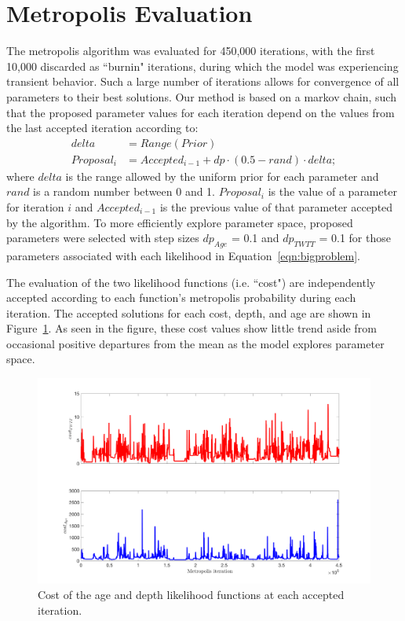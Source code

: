 \section{Metropolis Evaluation}

The metropolis algorithm was evaluated for 450,000 iterations, with the first 10,000 discarded as ``burnin" iterations, during which the model was experiencing transient behavior. Such a large number of iterations allows for convergence of all parameters to their best solutions. Our method is based on a markov chain, such that the proposed parameter values for each iteration depend on the values from the last accepted iteration according to:
\begin{equation}\label{eqn:proposal}
\begin{split}
delta&=Range(Prior) \\
Proposal_i&=Accepted_{i-1} + dp \cdot (0.5-rand) \cdot delta;
\end{split}
\end{equation}
where $delta$ is the range allowed by the uniform prior for each parameter and $rand$ is a random number between 0 and 1. $Proposal_i$ is the value of a parameter for iteration $i$ and $Accepted_{i-1}$ is the previous value of that parameter accepted by the algorithm. To more efficiently explore parameter space, proposed parameters were selected with step sizes $dp_{Age}$ = 0.1 and $dp_{TWTT}$ = 0.1 for those parameters associated with each likelihood in Equation~\ref{eqn:bigproblem}.

The evaluation of the two likelihood functions (i.e. ``cost") are independently accepted according to each function's metropolis probability during each iteration. The accepted solutions for each cost, depth, and age are shown in Figure~\ref{fig:cost}. As seen in the figure, these cost values show little trend aside from occasional positive departures from the mean as the model explores parameter space. 

\begin{figure}[ht]
\centering
\includegraphics[scale=0.4]{../analysis/figures/cost}
\caption[]{Cost of the age and depth likelihood functions at each accepted iteration.}
\label{fig:cost}
\end{figure}




